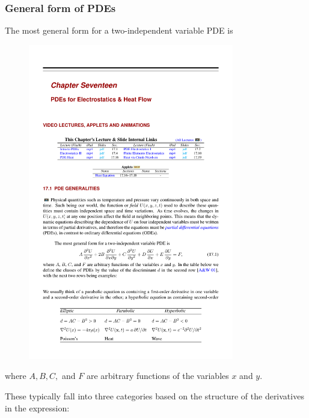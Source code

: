 \documentclass[hyperref={colorlinks=true}]{beamer}
\begin{document}
\begin{frame}%
  \frametitle{General form of PDEs}

  The most general form for a two-independent variable PDE is
  \begin{figure}
    \includegraphics[width=0.8\textwidth]{GeneralPDE.pdf}
  \end{figure}
  where $A, B, C,$ and $F$ are arbitrary functions of the variables $x$ and $y$. 
 
  \pause
  
  These typically fall into three categories based on the structure of the derivatives in the expression:
  

\end{frame}
\end{document}
